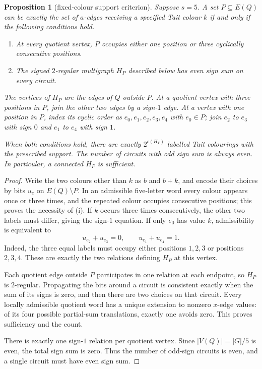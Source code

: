 \documentclass[11pt,a4paper]{article}
\newtheorem{proposition}[theorem]{Proposition}
\theoremstyle{definition}
\theoremstyle{remark}
\begin{document}
\begin{proposition}[fixed-colour support criterion]\label{prop:colour-support}
Suppose $s=5$.  A set $P\subseteq E(Q)$ can be exactly the set of $a$-edges receiving a specified Tait colour $k$ if and only if the following conditions hold.
\begin{enumerate}[label=\textup{(\roman*)}]
\item At every quotient vertex, $P$ occupies either one position or three cyclically consecutive positions.
\item The signed $2$-regular multigraph $H_P$ described below has even sign sum on every circuit.
\end{enumerate}
The vertices of $H_P$ are the edges of $Q$ outside $P$.  At a quotient vertex with three positions in $P$, join the other two edges by a sign-$1$ edge.  At a vertex with one position in $P$, index its cyclic order as $e_0,e_1,e_2,e_3,e_4$ with $e_0\in P$; join $e_2$ to $e_3$ with sign $0$ and $e_1$ to $e_4$ with sign $1$.

When both conditions hold, there are exactly $2^{c(H_P)}$ labelled Tait colourings with the prescribed support.  The number of circuits with odd sign sum is always even.  In particular, a connected $H_P$ is sufficient.
\end{proposition}
\begin{proof}
Write the two colours other than $k$ as $b$ and $b+k$, and encode their choices by bits $u_e$ on $E(Q)\setminus P$.  In an admissible five-letter word every colour appears once or three times, and the repeated colour occupies consecutive positions; this proves the necessity of \textup{(i)}.  If $k$ occurs three times consecutively, the other two labels must differ, giving the sign-$1$ equation.  If only $e_0$ has value $k$, admissibility is equivalent to
\[
 u_{e_2}+u_{e_3}=0,\qquad u_{e_1}+u_{e_4}=1.
\]
Indeed, the three equal labels must occupy either positions $1,2,3$ or positions $2,3,4$.  These are exactly the two relations defining $H_P$ at this vertex.

Each quotient edge outside $P$ participates in one relation at each endpoint, so $H_P$ is $2$-regular.  Propagating the bits around a circuit is consistent exactly when the sum of its signs is zero, and then there are two choices on that circuit.  Every locally admissible quotient word has a unique extension to nonzero $x$-edge values: of its four possible partial-sum translations, exactly one avoids zero.  This proves sufficiency and the count.

There is exactly one sign-$1$ relation per quotient vertex.  Since $|V(Q)|=|G|/5$ is even, the total sign sum is zero.  Thus the number of odd-sign circuits is even, and a single circuit must have even sign sum.
\end{proof}
\end{document}
